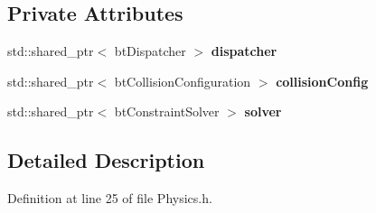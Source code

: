 \subsection*{Private Attributes}
\begin{DoxyCompactItemize}
\item 
std\+::shared\+\_\+ptr$<$ bt\+Dispatcher $>$ {\bfseries dispatcher}\hypertarget{class_physics_1_1_physics_a3a41a46b0d97a35e65f0230ff6b417a0}{}\label{class_physics_1_1_physics_a3a41a46b0d97a35e65f0230ff6b417a0}

\item 
std\+::shared\+\_\+ptr$<$ bt\+Collision\+Configuration $>$ {\bfseries collision\+Config}\hypertarget{class_physics_1_1_physics_abfab6c229512877ff6440656e92d75cd}{}\label{class_physics_1_1_physics_abfab6c229512877ff6440656e92d75cd}

\item 
std\+::shared\+\_\+ptr$<$ bt\+Constraint\+Solver $>$ {\bfseries solver}\hypertarget{class_physics_1_1_physics_a2927601ab8bb0bc242e28b180086050c}{}\label{class_physics_1_1_physics_a2927601ab8bb0bc242e28b180086050c}

\end{DoxyCompactItemize}


\subsection{Detailed Description}


Definition at line 25 of file Physics.\+h.

